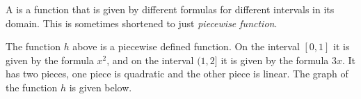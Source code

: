 \documentclass[nooutcomes]{ximera}
\begin{document}
	\begin{definition}
		A  is a function that is given by different formulas for different intervals in its domain. 
		This is sometimes shortened to just \emph{piecewise function}.
	\end{definition}

	The function $h$ above is a piecewise defined function. On the interval $[0,1]$ it is given by the formula $x^2$, and on the interval $(1,2]$
	it is given by the formula $3x$. It has two pieces, one piece is quadratic and the other piece is linear. The graph of the function $h$ is given below.

		\begin{image}
		\end{image}
\end{document}
